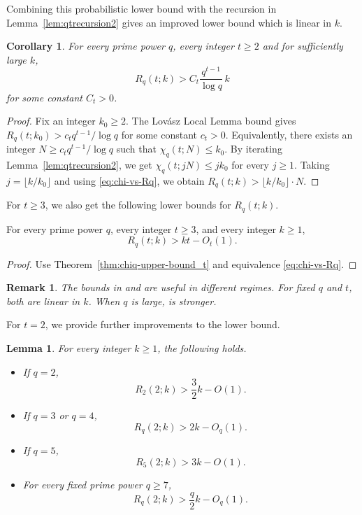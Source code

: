 \documentclass[11pt]{article}
\theoremstyle{plain}
\newtheorem{lemma}{Lemma}
\newtheorem{corollary}{Corollary}
\newtheorem{remark}{Remark}
\newenvironment{reptheorem}[1]{%
  \renewcommand\theinnerthm{\ref*{#1}}%
  \innerthm
}{\endinnerthm}
\begin{document}
Combining this probabilistic lower bound with the recursion in Lemma~\ref{lem:qtrecursion2} gives an improved lower bound which is linear in $k$. 

\begin{corollary}\label{cor:LLL-boost}
For every prime power $q$, every integer $t\ge2$ and for sufficiently large $k$,
\[
R_q(t;k)>C_t\frac{q^{t-1}}{\log q}\,k
\]
for some constant $C_t>0$.
\end{corollary}
\begin{proof}
Fix an integer $k_0\ge2$. 
The Lov\'asz Local Lemma bound gives $R_q(t;k_0)>c_t q^{t-1}/\log q$ for some constant $c_t>0$.
Equivalently, there exists an integer $N\ge c_t q^{t-1}/\log q$ such that $\chi_q(t;N)\le k_0$.
By iterating Lemma~\ref{lem:qtrecursion2}, we get $\chi_q(t;jN)\le jk_0$ for every $j\ge1$.
Taking $j=\lfloor k/k_0\rfloor$ and using \eqref{eq:chi-vs-Rq}, we obtain $
R_q(t;k)>\lfloor k/k_0\rfloor\cdot N$.
\end{proof}

For $t\ge3$, we also get the following lower bounds for $R_q(t;k)$.

\begin{reptheorem}{thm:Rqt-lower}
For every prime power $q$, every integer $t\ge3$, and every integer $k\ge1$,
\[
R_q(t;k)>kt-O_t(1).
\]
\end{reptheorem}
\begin{proof}
    Use Theorem~\ref{thm:chiq-upper-bound_t} and equivalence \eqref{eq:chi-vs-Rq}.
\end{proof}
\begin{remark}
The bounds in  and  are useful in different regimes.
For fixed $q$ and $t$, both are linear in $k$. 
When $q$ is large,  is stronger.
\end{remark}

For $t=2$, we provide further improvements to the lower bound.

\begin{lemma}\label{lem:Rq2k-lower}
For every integer $k\ge 1$, the following holds.
\begin{itemize}
    \item If $q=2$,
        \[
        R_2(2;k)>\frac32 k-O(1).
        \]
    \item If $q=3$ or $q=4$,
        \[
        R_q(2;k)>2k-O_q(1).
        \]
    \item If $q=5$,
        \[
        R_5(2;k)>3k-O(1).
        \]
    \item For every fixed prime power $q\ge7$,
        \[
        R_q(2;k)>\frac q2 k-O_q(1).
        \]
\end{itemize}
\end{lemma}
\end{document}
